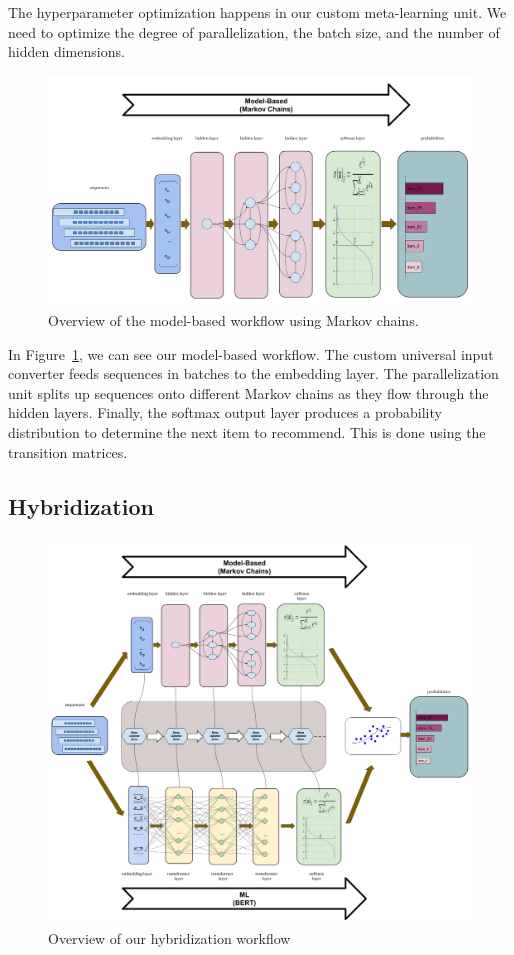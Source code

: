 The hyperparameter optimization happens in our custom meta-learning unit. We need to optimize the degree of parallelization, the batch size, and the number of hidden dimensions. 


\begin{figure}[htbp]
\centering
\includegraphics[width=1\textwidth]{images/diagrams/model_based_path.png}
\caption{Overview of the model-based workflow using Markov chains.}
\label{fig:model_based_flow}
\end{figure}

In Figure~\ref{fig:model_based_flow}, we can see our model-based workflow. The custom universal input converter feeds sequences in batches to the embedding layer. The parallelization unit splits up sequences onto different Markov chains as they flow through the hidden layers. Finally, the softmax output layer produces a probability distribution to determine the next item to recommend. This is done using the transition matrices. 


\subsection{Hybridization}

\begin{figure}[htbp]
\centering
\includegraphics[width=1\textwidth]{images/diagrams/hybrid_path.png}
\caption{Overview of our hybridization workflow}
\label{fig:hybrid_flow}
\end{figure}

